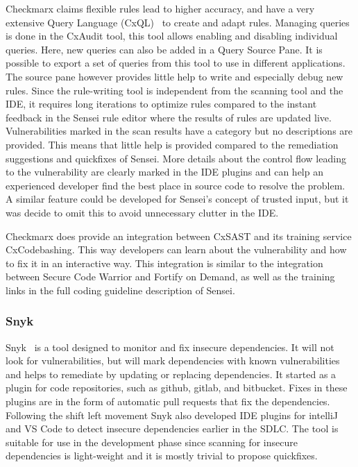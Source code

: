 Checkmarx claims flexible rules lead to higher accuracy, and have a very extensive Query Language (CxQL)~\cite{cxaudit} to create and adapt rules.  Managing queries is done in the CxAudit tool, this tool allows enabling and disabling individual queries. Here, new queries can also be added in a Query Source Pane. It is possible to export a set of queries from this tool to use in different applications. The source pane however provides little help to write and especially debug new rules. Since the rule-writing tool is independent from the scanning tool and the IDE, it requires long iterations to optimize rules compared to the instant feedback in the Sensei rule editor where the results of rules are updated live. Vulnerabilities marked in the scan results have a category but no descriptions are provided. This means that little help is provided compared to the remediation suggestions and quickfixes of Sensei. More details about the control flow leading to the vulnerability are clearly marked in the IDE plugins and can help an experienced developer find the best place in source code to resolve the problem. A similar feature could be developed for Sensei's concept of trusted input, but it was decide to omit this to avoid unnecessary clutter in the IDE.

Checkmarx does provide an integration between CxSAST and its training service CxCodebashing. This way developers can learn about the vulnerability and how to fix it in an interactive way. This integration is similar to the integration between Secure Code Warrior and Fortify on Demand, as well as the training links in the full coding guideline description of Sensei.

\subsubsection{Snyk}
Snyk~\cite{snyk} is a tool designed to monitor and fix insecure dependencies. It will not look for vulnerabilities, but will mark dependencies with known vulnerabilities and helps to remediate by updating or replacing dependencies. It started as a plugin for code repositories, such as github, gitlab, and bitbucket. Fixes in these plugins are in the form of automatic pull requests that fix the dependencies. Following the shift left movement Snyk also developed IDE plugins for intelliJ and VS Code to detect insecure dependencies earlier in the SDLC. The tool is suitable for use in the development phase since scanning for insecure dependencies is light-weight and it is mostly trivial to propose quickfixes.

